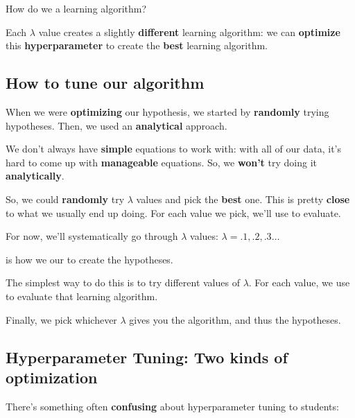         How do we  a learning algorithm?
        
        Each $\lambda$ value creates a slightly \textbf{different} learning algorithm: we can \textbf{optimize} this \textbf{hyperparameter} to create the \textbf{best} learning algorithm.
        
    \subsection{How to tune our algorithm}
    
        When we were \textbf{optimizing} our hypothesis, we started by \textbf{randomly} trying hypotheses. Then, we used an \textbf{analytical} approach.
        
        We don't always have \textbf{simple} equations to work with: with all of our data, it's hard to come up with \textbf{manageable} equations. So, we \textbf{won't} try doing it \textbf{analytically}.
        
        So, we could \textbf{randomly} try $\lambda$ values and pick the \textbf{best} one. This is pretty \textbf{close} to what we usually end up doing. For each value we pick, we'll use  to evaluate.
        
        For now, we'll systematically go through $\lambda$ values: $\lambda=.1, .2, .3 \dots$\\
        
        \begin{concept}
             is how we  our  to create the  hypotheses.
            
            The simplest way to do this is to try  different values of $\lambda$. For each value, we use  to evaluate that learning algorithm.
            
            Finally, we pick whichever $\lambda$ gives you the  algorithm, and thus the  hypotheses.
        \end{concept}
        
    \subsection{Hyperparameter Tuning: Two kinds of optimization}
    
        There's something often \textbf{confusing} about hyperparameter tuning to students:

